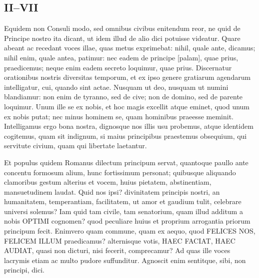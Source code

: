 \subsection*{II–VII}

Equidem non Consuli modo, sed omnibus civibus enitendum reor, ne quid de Principe nostro ita dicant, ut idem illud de alio dici potuisse videatur. Quare abeant ac recedant voces illae, quas metus exprimebat: nihil, quale ante, dicamus; nihil enim, quale antea, patimur: nec eadem de principe [palam], quae prius, praedicemus; neque enim eadem secreto loquimur, quae prius. Discernatur orationibus nostris diversitas temporum, et ex ipso genere gratiarum agendarum intelligatur, cui, quando sint actae. Nusquam ut deo, nusquam ut numini blandiamur: non enim de tyranno, sed de cive; non de domino, sed de parente loquimur. Unum ille se ex nobis, et hoc magis excellit atque eminet, quod unum ex nobis putat; nec minus hominem se, quam hominibus praeesse meminit. Intelligamus ergo bona nostra, dignosque nos illis usu probemus, atque identidem cogitemus, quam sit indignum, si maius principibus praestemus obsequium, qui servitute civium, quam qui libertate laetantur. 

Et populus quidem Romanus dilectum principum servat, quantoque paullo ante concentu formosum alium, hunc fortissimum personat; quibusque aliquando clamoribus gestum alterius et vocem, huius pietatem, abstinentiam, mansuetudinem laudat. Quid nos ipsi? divinitatem principis nostri, an humanitatem, temperantiam, facilitatem, ut amor et gaudium tulit, celebrare universi solemus? Iam quid tam civile, tam senatorium, quam illud additum a nobis OPTIMI cognomen? quod peculiare huius et proprium arrogantia priorum principum fecit. Enimvero quam commune, quam ex aequo, quod FELICES NOS, FELICEM ILLUM praedicamus? alternisque votis, HAEC FACIAT, HAEC AUDIAT, quasi non dicturi, nisi fecerit, comprecamur? Ad quas ille voces lacrymis etiam ac multo pudore suffunditur. Agnoscit enim sentitque, sibi, non principi, dici.

